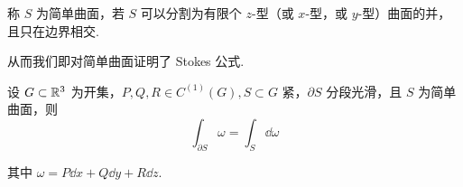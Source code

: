 \begin{definition}
    称 $S$ 为简单曲面，若 $S$ 可以分割为有限个 $z$-型（或 $x$-型，或 $y$-型）曲面的并，且只在边界相交.
\end{definition}

从而我们即对简单曲面证明了 Stokes 公式.

\begin{property}
    设 $G\subset\mathbb{R}^3$ 为开集，$P,Q,R\in C^{(1)}(G),S\subset G$ 紧，$\partial S$ 分段光滑，且 $S$ 为简单曲面，则
$$
\int_{\partial S}\omega=\int_S\dd\omega
$$

    其中 $\omega=P\dd x+Q\dd y+R\dd z$.
\end{property}



